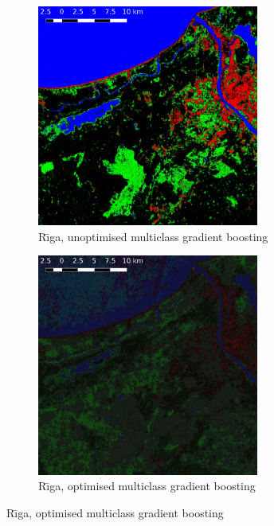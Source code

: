 \documentclass[a4paper,12pt]{scrbook}
\begin{document}
\begin{figure}
  \centering
  \begin{subfigure}[b]{0.48\textwidth}
    \centering
    \includegraphics[width=0.8\textwidth]{thesis-figures/figures-qgis/riga-gbu}
    \caption{R\={\i}ga, unoptimised multiclass gradient boosting}
  \end{subfigure} \hfill
  \begin{subfigure}[b]{0.48\textwidth}
    \centering
    \includegraphics[width=0.8\textwidth]{thesis-figures/figures-qgis/riga-gbo}
    \caption{R\={\i}ga, optimised multiclass gradient boosting}
  \end{subfigure}

\end{figure}
\end{document}
